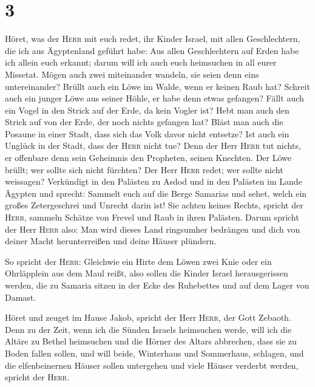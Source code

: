 \hypertarget{section-2}{%
\section{3}\label{section-2}}

 Höret, was der \textsc{Herr} mit euch redet, ihr Kinder
Israel, mit allen Geschlechtern, die ich aus Ägyptenland geführt habe:
 Aus allen Geschlechtern auf Erden habe ich allein euch
erkannt; darum will ich auch euch heimsuchen in all eurer Missetat.
 Mögen auch zwei miteinander wandeln, sie seien denn eins
untereinander?  Brüllt auch ein Löwe im Walde, wenn er
keinen Raub hat? Schreit auch ein junger Löwe aus seiner Höhle, er habe
denn etwas gefangen?  Fällt auch ein Vogel in den Strick
auf der Erde, da kein Vogler ist? Hebt man auch den Strick auf von der
Erde, der noch nichts gefangen hat?  Bläst man auch die
Posaune in einer Stadt, dass sich das Volk davor nicht entsetze? Ist
auch ein Unglück in der Stadt, dass der \textsc{Herr} nicht tue?
 Denn der Herr \textsc{Herr} tut nichts, er offenbare denn
sein Geheimnis den Propheten, seinen Knechten.  Der Löwe
brüllt; wer sollte sich nicht fürchten? Der Herr \textsc{Herr} redet;
wer sollte nicht weissagen?  Verkündigt in den Palästen zu
Asdod und in den Palästen im Lande Ägypten und sprecht: Sammelt euch auf
die Berge Samarias und sehet, welch ein großes Zetergeschrei und Unrecht
darin ist!  Sie achten keines Rechts, spricht der
\textsc{Herr}, sammeln Schätze von Frevel und Raub in ihren Palästen.
 Darum spricht der Herr \textsc{Herr} also: Man wird
dieses Land ringsumher bedrängen und dich von deiner Macht
herunterreißen und deine Häuser plündern.

 So spricht der \textsc{Herr}: Gleichwie ein Hirte dem
Löwen zwei Knie oder ein Ohrläpplein aus dem Maul reißt, also sollen die
Kinder Israel herausgerissen werden, die zu Samaria sitzen in der Ecke
des Ruhebettes und auf dem Lager von Damast.

 Höret und zeuget im Hause Jakob, spricht der Herr
\textsc{Herr}, der Gott Zebaoth.  Denn zu der Zeit, wenn
ich die Sünden Israels heimsuchen werde, will ich die Altäre zu Bethel
heimsuchen und die Hörner des Altars abbrechen, dass sie zu Boden fallen
sollen,  und will beide, Winterhaus und Sommerhaus,
schlagen, und die elfenbeinernen Häuser sollen untergehen und viele
Häuser verderbt werden, spricht der \textsc{Herr}.

